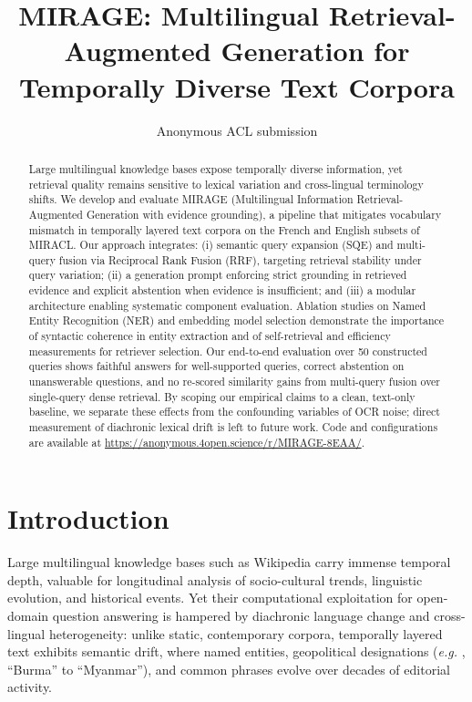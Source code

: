 \documentclass[11pt]{article}
\title{MIRAGE: Multilingual Retrieval-Augmented Generation for Temporally Diverse Text Corpora}
\author{Anonymous ACL submission}
\newcommand{\eg}{\textit{e.g. }}
\begin{document}
\maketitle
\begin{abstract}
Large multilingual knowledge bases expose temporally diverse information, yet retrieval quality remains sensitive to lexical variation and cross-lingual terminology shifts. We develop and evaluate MIRAGE (Multilingual Information Retrieval-Augmented Generation with evidence grounding), a pipeline that mitigates vocabulary mismatch in temporally layered text corpora on the French and English subsets of MIRACL. Our approach integrates: (i) semantic query expansion (SQE) and multi-query fusion via Reciprocal Rank Fusion (RRF), targeting retrieval stability under query variation; (ii) a generation prompt enforcing strict grounding in retrieved evidence and explicit abstention when evidence is insufficient; and (iii) a modular architecture enabling systematic component evaluation. Ablation studies on Named Entity Recognition (NER) and embedding model selection demonstrate the importance of syntactic coherence in entity extraction and of self-retrieval and efficiency measurements for retriever selection. Our end-to-end evaluation over 50 constructed queries shows faithful answers for well-supported queries, correct abstention on unanswerable questions, and no re-scored similarity gains from multi-query fusion over single-query dense retrieval. By scoping our empirical claims to a clean, text-only baseline, we separate these effects from the confounding variables of OCR noise; direct measurement of diachronic lexical drift is left to future work. Code and configurations are available at \url{https://anonymous.4open.science/r/MIRAGE-8EAA/}.
\end{abstract}

\section{Introduction}
\label{sec:intro}

Large multilingual knowledge bases such as Wikipedia carry immense temporal depth, valuable for longitudinal analysis of socio-cultural trends, linguistic evolution, and historical events. Yet their computational exploitation for open-domain question answering is hampered by diachronic language change and cross-lingual heterogeneity: unlike static, contemporary corpora, temporally layered text exhibits semantic drift, where named entities, geopolitical designations (\eg, ``Burma'' to ``Myanmar''), and common phrases evolve over decades of editorial activity.
\end{document}
